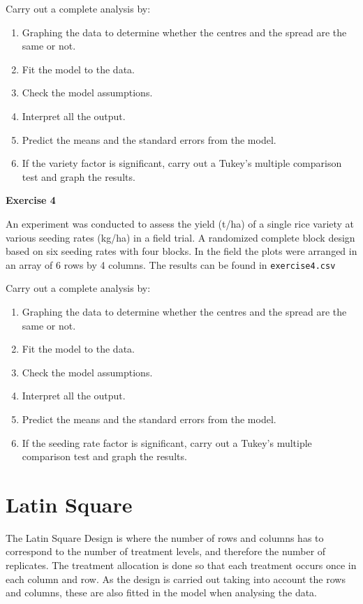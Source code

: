 \documentclass[a4paper, 10pt, fleqn, twosided]{memoir}
\begin{document}
Carry out a complete analysis by:
\begin{enumerate}
  \item Graphing the data to determine whether the centres and the spread are the same or not.
  \item Fit the model to the data.
  \item Check the model assumptions.
  \item Interpret all the output.
  \item Predict the means and the standard errors from the model.
  \item If the variety factor is significant, carry out a Tukey's multiple comparison test and graph the results.
\end{enumerate}


\textbf{Exercise 4}

An experiment was conducted to assess the yield (t/ha) of a single rice variety at various seeding rates (kg/ha) in a
field trial. A randomized complete block design based on six seeding rates with four blocks. In the field the plots
were arranged in an array of 6 rows by 4 columns. The results can be found in \texttt{exercise4.csv}


Carry out a complete analysis by:
\begin{enumerate}
  \item Graphing the data to determine whether the centres and the spread are the same or not.
  \item Fit the model to the data.
  \item Check the model assumptions.
  \item Interpret all the output.
  \item Predict the means and the standard errors from the model.
  \item If the seeding rate factor is significant, carry out a Tukey's multiple comparison test and graph the
      results.
\end{enumerate}

\clearpage


\section{Latin Square}

The Latin Square Design is where the number of rows and columns has to correspond to the number of treatment levels,
and therefore the number of replicates. The treatment allocation is done so that each treatment occurs once in each
column and row. As the design is carried out taking into account the rows and columns, these are also fitted in the
model when analysing the data.
\end{document}
